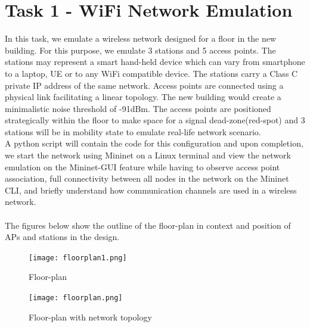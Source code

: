 \documentclass{article}
\begin{document}
\section{Task 1 - WiFi Network Emulation}
In this task, we emulate a wireless network designed for a floor in the new building. For this purpose, we emulate 3 stations and 5 access points. The stations may represent a smart hand-held device which can vary from smartphone to a laptop, UE or to any WiFi compatible device. The stations carry a Class C private IP address of the same network. Access points are connected using a physical link facilitating a linear topology. The new building would create a minimalistic noise threshold of -91dBm. The access points are positioned strategically within the floor to make space for a signal dead-zone(red-spot) and 3 stations will be in mobility state to emulate real-life network scenario. \\ A python script will contain the code for this configuration and upon completion, we start the network using Mininet on a Linux terminal and view the network emulation on the Mininet-GUI feature while having to observe access point association, full connectivity between all nodes in the network on the Mininet CLI, and briefly understand how communication channels are used in a wireless network. \\\\
The figures below show the outline of the floor-plan in context and position of APs and  stations in the design.
    	\begin{figure}[h]
		\centering
        		\texttt{[image: floorplan1.png]}
        		\caption{Floor-plan}
        		\label{fig:t1-1}
        		\endminipage
        		\texttt{[image: floorplan.png]}
        		\caption{Floor-plan with network topology}
       		\label{fig:t1-2}
       		\endminipage
    	\end{figure} 
\end{document}
